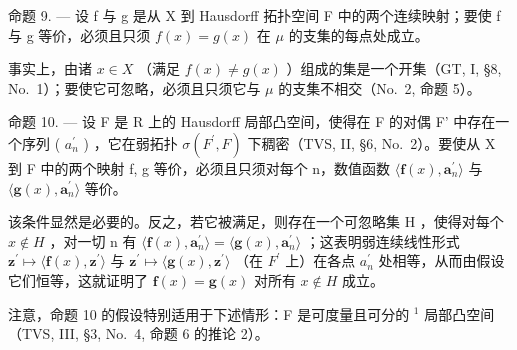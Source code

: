 命题 9. --- 设 f 与 g 是从 X 到 Hausdorff 拓扑空间 F 中的两个连续映射；要使 f 与 g 等价，必须且只须 \(f(x) = g(x)\) 在 \(\mu\) 的支集的每点处成立。

事实上，由诸 \(x \in X\) （满足 \(f(x) \neq g(x)\) ）组成的集是一个开集（GT, I, §8, No.~1）；要使它可忽略，必须且只须它与 \(\mu\) 的支集不相交（No.~2, 命题 5）。

命题 10. --- 设 F 是 R 上的 Hausdorff 局部凸空间，使得在 F 的对偶 F' 中存在一个序列 ( \(a_{n}^{\prime}\) ) ，它在弱拓扑 \(\sigma(F^{\prime},F)\) 下稠密（TVS, II, §6, No.~2）。要使从 X 到 F 中的两个映射 f, g 等价，必须且只须对每个 n，数值函数 \(\langle\mathbf{f}(x),\mathbf{a}_{n}^{\prime}\rangle\) 与 \(\langle\mathbf{g}(x),\mathbf{a}_{n}^{\prime}\rangle\) 等价。

该条件显然是必要的。反之，若它被满足，则存在一个可忽略集 H ，使得对每个 \(x \notin H\) ，对一切 n 有 \(\langle \mathbf{f}(x), \mathbf{a}_{n}^{\prime} \rangle = \langle \mathbf{g}(x), \mathbf{a}_{n}^{\prime} \rangle\) ；这表明弱连续线性形式 \(\mathbf{z}^{\prime} \mapsto \langle \mathbf{f}(x), \mathbf{z}^{\prime} \rangle\) 与 \(\mathbf{z}^{\prime} \mapsto \langle \mathbf{g}(x), \mathbf{z}^{\prime} \rangle\) （在 \(F^{\prime}\) 上）在各点 \(a_{n}^{\prime}\) 处相等，从而由假设它们恒等，这就证明了 \(\mathbf{f}(x) = \mathbf{g}(x)\) 对所有 \(x \notin H\) 成立。

注意，命题 10 的假设特别适用于下述情形：F 是可度量且可分的 \(^{1}\) 局部凸空间（TVS, III, §3, No.~4, 命题 6 的推论 2）。

